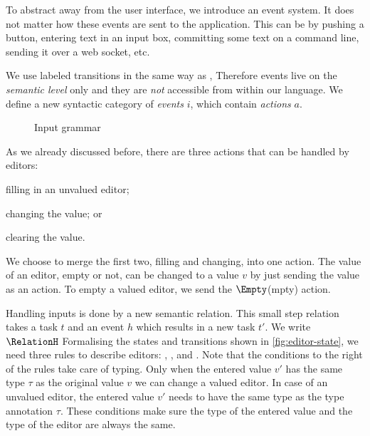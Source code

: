 To abstract away from the user interface,
we introduce an event system.
It does not matter how these events are sent to the application.
This can be by pushing a button,
entering text in an input box,
committing some text on a command line,
sending it over a web socket,
etc.

%
We use labeled transitions in the same way as \textcite{school/maktoberdorf/PeytonJones01},
Therefore events live on the \emph{semantic level} only
and they are \emph{not} accessible from within our language.
We define a new syntactic category of \emph{events} $i$,
which contain \emph{actions} $a$.

\begin{figure}[h]
  \small
  \caption{Input grammar} \label{fig:input-grammar}
\end{figure}

As we already discussed before,
there are three actions that can be handled by editors:
\begin{enumerate*}
  \item filling in an unvalued editor;
  \item changing the value; or
  \item clearing the value.
\end{enumerate*}
We choose to merge the first two, filling and changing, into one action.
The value of an editor, empty or not, can be changed to a value $v$ by just sending the value as an action.
To empty a valued editor, we send the $\Empty$(mpty) action.

Handling inputs is done by a new semantic relation.
This small step relation takes a task $t$ and an event $h$ which results in a new task $t'$.
We write $\RelationH$
Formalising the states and transitions shown in \cref{fig:editor-state},
we need three rules to describe editors:
, , and .
Note that the conditions to the right of the rules take care of typing.
Only when the entered value $v'$ has the same type $\tau$ as the original value $v$ we can change a valued editor.
In case of an unvalued editor,
the entered value $v'$ needs to have the same type as the type annotation $\tau$.
These conditions make sure the type of the entered value and the type of the editor are always the same.

